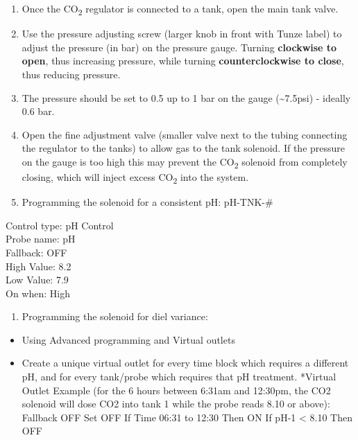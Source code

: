 \documentclass[]{book}
\providecommand{\tightlist}{%
  \setlength{\itemsep}{0pt}\setlength{\parskip}{0pt}}
\begin{document}
\begin{enumerate}
\def\labelenumi{\arabic{enumi}.}
\tightlist
\item
  Once the CO\textsubscript{2} regulator is connected to a tank, open
  the main tank valve.
\item
  Use the pressure adjusting screw (larger knob in front with Tunze
  label) to adjust the pressure (in bar) on the pressure gauge. Turning
  \textbf{clockwise to open}, thus increasing pressure, while turning
  \textbf{counterclockwise to close}, thus reducing pressure.
\item
  The pressure should be set to 0.5 up to 1 bar on the gauge
  (\textasciitilde{}7.5psi) - ideally 0.6 bar.
\item
  Open the fine adjustment valve (smaller valve next to the tubing
  connecting the regulator to the tanks) to allow gas to the tank
  solenoid. If the pressure on the gauge is too high this may prevent
  the CO\textsubscript{2} solenoid from completely closing, which will
  inject excess CO\textsubscript{2} into the system.
\item
  Programming the solenoid for a consistent pH: pH-TNK-\#
\end{enumerate}

Control type: pH Control\\
Probe name: pH\\
Fallback: OFF\\
High Value: 8.2\\
Low Value: 7.9\\
On when: High

\begin{enumerate}
\def\labelenumi{\arabic{enumi}.}
\setcounter{enumi}{5}
\tightlist
\item
  Programming the solenoid for diel variance:
\end{enumerate}

\begin{itemize}
\tightlist
\item
  Using Advanced programming and Virtual outlets
\item
  Create a unique virtual outlet for every time block which requires a
  different pH, and for every tank/probe which requires that pH
  treatment. *Virtual Outlet Example (for the 6 hours between 6:31am and
  12:30pm, the CO2 solenoid will dose CO2 into tank 1 while the probe
  reads 8.10 or above): Fallback OFF Set OFF If Time 06:31 to 12:30 Then
  ON If pH-1 \textless{} 8.10 Then OFF
\end{itemize}
\end{document}
